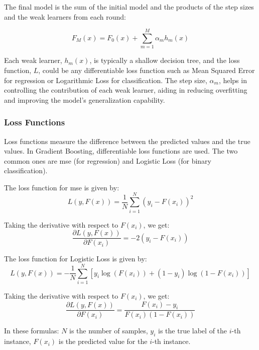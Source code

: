 The final model is the sum of the initial model and the products of the step sizes and the weak learners from each round:

\begin{equation}
F_M(x) = F_0(x) + \sum_{m=1}^M \alpha_m h_m(x)
\end{equation}


Each weak learner, \( h_m(x) \), is typically a shallow decision tree, and the loss function, \( L \), could be any differentiable loss function such as Mean Squared Error for regression or Logarithmic Loss for classification. The step size, \( \alpha_m \), helps in controlling the contribution of each weak learner, aiding in reducing overfitting and improving the model's generalization capability.

\subsubsection{Loss Functions}

Loss functions measure the difference between the predicted values and the true values. In Gradient Boosting, differentiable loss functions are used. The two common ones are \Gls{mse} (for regression) and Logistic Loss (for binary classification).

The loss function for \gls{mse} is given by:
\begin{equation}
L(y, F(x)) = \frac{1}{N} \sum_{i=1}^N (y_i - F(x_i))^2
\end{equation}

Taking the derivative with respect to \( F(x_i) \), we get:
\begin{equation}
\frac{\partial L(y, F(x))}{\partial F(x_i)} = -2(y_i - F(x_i))
\end{equation}

The loss function for Logistic Loss is given by:
\begin{equation}
L(y, F(x)) = - \frac{1}{N} \sum_{i=1}^N [ y_i \log(F(x_i)) + (1-y_i) \log(1-F(x_i)) ]
\end{equation}

Taking the derivative with respect to \( F(x_i) \), we get:
\begin{equation}
\frac{\partial L(y, F(x))}{\partial F(x_i)} = \frac{F(x_i) - y_i}{F(x_i)(1 - F(x_i))}
\end{equation}

In these formulas: \( N \) is the number of samples, \( y_i \) is the true label of the \( i \)-th instance, \( F(x_i) \) is the predicted value for the \( i \)-th instance.

